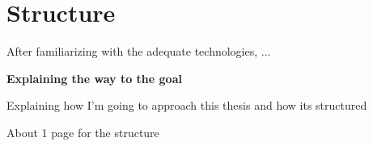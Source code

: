
\chapter{Structure}
\label{ch:structure}

After familiarizing with the adequate technologies, ...

\textbf{Explaining the way to the goal}

Explaining how I'm going to approach this thesis and how its structured

About 1 page for the structure

\pagebreak[1]